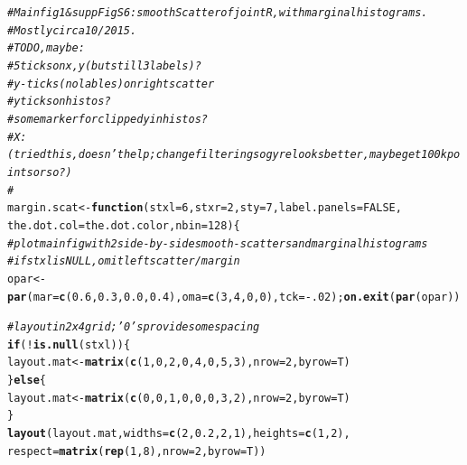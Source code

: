 \documentclass{article}\usepackage[]{graphicx}\usepackage[]{color}
\makeatletter
\newcommand{\hlnum}[1]{\textcolor[rgb]{0.686,0.059,0.569}{#1}}%
\newcommand{\hlcom}[1]{\textcolor[rgb]{0.678,0.584,0.686}{\textit{#1}}}%
\newcommand{\hlopt}[1]{\textcolor[rgb]{0,0,0}{#1}}%
\newcommand{\hlstd}[1]{\textcolor[rgb]{0.345,0.345,0.345}{#1}}%
\newcommand{\hlkwa}[1]{\textcolor[rgb]{0.161,0.373,0.58}{\textbf{#1}}}%
\newcommand{\hlkwb}[1]{\textcolor[rgb]{0.69,0.353,0.396}{#1}}%
\newcommand{\hlkwc}[1]{\textcolor[rgb]{0.333,0.667,0.333}{#1}}%
\newcommand{\hlkwd}[1]{\textcolor[rgb]{0.737,0.353,0.396}{\textbf{#1}}}%
\newenvironment{kframe}{%
 \def\at@end@of@kframe{}%
 \ifinner\ifhmode%
  \def\at@end@of@kframe{\end{minipage}}%
  \begin{minipage}{\columnwidth}%
 \fi\fi%
 \def\FrameCommand##1{\hskip\@totalleftmargin \hskip-\fboxsep
 \colorbox{shadecolor}{##1}\hskip-\fboxsep
     \hskip-\linewidth \hskip-\@totalleftmargin \hskip\columnwidth}%
 \MakeFramed {\advance\hsize-\width
   \@totalleftmargin\z@ \linewidth\hsize
   \@setminipage}}%
 {\par\unskip\endMakeFramed%
 \at@end@of@kframe}
\newenvironment{knitrout}{}{} %
\makeatother
\begin{document}
\begin{knitrout}\footnotesize
{}\color{fgcolor}\begin{kframe}
\begin{alltt}
\hlcom{# Main fig 1 & supp Fig S6: smoothScatter of joint R, with marginal histograms.}
\hlcom{# Mostly circa 10/2015.}
\hlcom{# TO DO, maybe: }
\hlcom{#   5 ticks on x,y (but still 3 labels)?}
\hlcom{#   y-ticks (no lables) on right scatter}
\hlcom{#   y ticks on histos?}
\hlcom{#   some marker for clipped y in histos?}
\hlcom{#   X: (tried this, doesn't help; change filtering so gyre looks better, maybe get 100 k points or so?)}
\hlcom{#   }
\hlstd{margin.scat} \hlkwb{<-} \hlkwa{function}\hlstd{(}\hlkwc{stxl}\hlstd{=}\hlnum{6}\hlstd{,} \hlkwc{stxr}\hlstd{=}\hlnum{2}\hlstd{,} \hlkwc{sty}\hlstd{=}\hlnum{7}\hlstd{,} \hlkwc{label.panels}\hlstd{=}\hlnum{FALSE}\hlstd{,}
                        \hlkwc{the.dot.col}\hlstd{=the.dot.color,} \hlkwc{nbin}\hlstd{=}\hlnum{128}\hlstd{)\{}
  \hlcom{# plot main fig with 2 side-by-side smooth-scatters and marginal histograms}
  \hlcom{# if stxl is NULL, omit left scatter/margin}
  \hlstd{opar} \hlkwb{<-} \hlkwd{par}\hlstd{(}\hlkwc{mar}\hlstd{=}\hlkwd{c}\hlstd{(}\hlnum{0.6}\hlstd{,}\hlnum{0.3}\hlstd{,}\hlnum{0.0}\hlstd{,}\hlnum{0.4}\hlstd{),}\hlkwc{oma}\hlstd{=}\hlkwd{c}\hlstd{(}\hlnum{3}\hlstd{,}\hlnum{4}\hlstd{,}\hlnum{0}\hlstd{,}\hlnum{0}\hlstd{),}\hlkwc{tck}\hlstd{=}\hlopt{-}\hlnum{.02}\hlstd{);} \hlkwd{on.exit}\hlstd{(}\hlkwd{par}\hlstd{(opar))}

  \hlcom{# layout in 2 x 4 grid; '0's provide some spacing}
  \hlkwa{if}\hlstd{(}\hlopt{!}\hlkwd{is.null}\hlstd{(stxl))\{}
    \hlstd{layout.mat} \hlkwb{<-} \hlkwd{matrix}\hlstd{(}\hlkwd{c}\hlstd{(}\hlnum{1}\hlstd{,}\hlnum{0}\hlstd{,}\hlnum{2}\hlstd{,}\hlnum{0}\hlstd{,}\hlnum{4}\hlstd{,}\hlnum{0}\hlstd{,}\hlnum{5}\hlstd{,}\hlnum{3}\hlstd{),}\hlkwc{nrow}\hlstd{=}\hlnum{2}\hlstd{,}\hlkwc{byrow}\hlstd{=T)}
  \hlstd{\}} \hlkwa{else} \hlstd{\{}
    \hlstd{layout.mat} \hlkwb{<-} \hlkwd{matrix}\hlstd{(}\hlkwd{c}\hlstd{(}\hlnum{0}\hlstd{,}\hlnum{0}\hlstd{,}\hlnum{1}\hlstd{,}\hlnum{0}\hlstd{,}\hlnum{0}\hlstd{,}\hlnum{0}\hlstd{,}\hlnum{3}\hlstd{,}\hlnum{2}\hlstd{),}\hlkwc{nrow}\hlstd{=}\hlnum{2}\hlstd{,}\hlkwc{byrow}\hlstd{=T)}
  \hlstd{\}}
  \hlkwd{layout}\hlstd{(layout.mat,} \hlkwc{widths}\hlstd{=}\hlkwd{c}\hlstd{(}\hlnum{2}\hlstd{,}\hlnum{0.2}\hlstd{,}\hlnum{2}\hlstd{,}\hlnum{1}\hlstd{),}\hlkwc{heights}\hlstd{=}\hlkwd{c}\hlstd{(}\hlnum{1}\hlstd{,}\hlnum{2}\hlstd{),}
         \hlkwc{respect}\hlstd{=}\hlkwd{matrix}\hlstd{(}\hlkwd{rep}\hlstd{(}\hlnum{1}\hlstd{,}\hlnum{8}\hlstd{),}\hlkwc{nrow}\hlstd{=}\hlnum{2}\hlstd{,}\hlkwc{byrow}\hlstd{=T))}


\end{alltt}
\end{kframe}
\end{knitrout}
\end{document}
